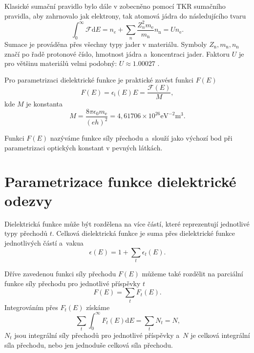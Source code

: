 Klasické sumační pravidlo bylo dále v \cite{sumrule} zobecněno pomocí TKR sumačního pravidla, aby zahrnovalo jak elektrony, tak atomová jádra do následujícího tvaru
\begin{equation}
\int_0^\infty \mathcal{F} \mathrm{d}E = n_e + \sum_n \frac{Z_n^2 m_\mathrm{e}} {m_\mathrm{n}} n_\mathrm{n} = U n_\mathrm{e} \mathrm{.} %
\end{equation}
Sumace je prováděna přes všechny typy jader v materiálu. Symboly $Z_\mathrm{n}, m_\mathrm{n}, n_\mathrm{n}$ značí po řadě protonové číslo, hmotnost jádra a~koncentraci jader. Faktoru $U$ je pro většinu materiálů velmi podobný: $U \approx 1.00027$ \cite{sumrule}.

Pro parametrizaci dielektrické funkce je praktické zavést funkci $F(E)$
\begin{equation}
F(E) = \epsilon_\mathrm{i}(E) E = \frac{\mathcal{F}(E)}{M}\mathrm{,}
\end{equation}  
kde $M$ je konstanta
\begin{equation} 
M = \frac{8 \pi \epsilon_0 m_\mathrm{e}}{(e h)^2} = 4,61706\times10^{26} \mathrm{eV}^{-2}\mathrm{m}^3 \mathrm{.}
\end{equation}

Funkci $F(E)$ nazýváme funkce síly přechodu a~slouží jako výchozí bod při parametrizaci optických konstant v pevných látkách.

\section{Parametrizace funkce dielektrické odezvy}
Dielektrická funkce může být rozdělena na více částí, které reprezentují jednotlivé typy přechodů $t$. Celková dielektrická funkce je suma přes dielektrické funkce jednotlivých částí a~vakua \cite{sumrule}
\begin{equation}
\epsilon(E) = 1 + \sum_t \epsilon_t(E) \text{.}
\label{suma1}
\end{equation}

Dříve zavedenou funkci síly přechodu $F(E)$ můžeme také rozdělit na parciální funkce síly přechodu pro jednotlivé příspěvky $t$
\begin{equation}
F(E) = \sum_t F_t(E) \text{.}
\end{equation}
Integrováním přes $F_t(E)$ získáme 
\begin{equation}
\label{definiceceelkovesily}
\sum_t \int_0^\infty F_t(E)\mathrm{d}E = \sum_t N_t = N \text{,}
\end{equation}
$N_t$ jsou integrální síly přechodů pro jednotlivé příspěvky a~$N$ je celková integrální síla přechodu, nebo jen jednoduše celková síla přechodu.  

